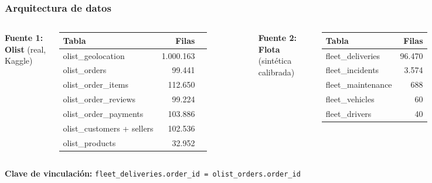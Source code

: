\documentclass[aspectratio=169,11pt]{beamer}
\begin{document}

\begin{frame}

\frametitle{Arquitectura de datos}

\begin{columns}[T]

\centering
\textbf{Fuente 1: Olist} {\small (real, Kaggle)}

\vspace{1mm}

\begin{tabular}{@{}lrr@{}}
\toprule
Tabla & Filas \\
\midrule
olist\_geolocation & 1.000.163 \\
olist\_orders & 99.441 \\
olist\_order\_items & 112.650 \\
olist\_order\_reviews & 99.224 \\
olist\_order\_payments & 103.886 \\
olist\_customers + sellers & 102.536 \\
olist\_products & 32.952 \\
\bottomrule
\end{tabular}



\centering
\textbf{Fuente 2: Flota} {\small (sintética calibrada)}

\vspace{1mm}

\begin{tabular}{@{}lr@{}}
\toprule
Tabla & Filas \\
\midrule
fleet\_deliveries & 96.470 \\
fleet\_incidents & 3.574 \\
fleet\_maintenance & 688 \\
fleet\_vehicles & 60 \\
fleet\_drivers & 40 \\
\bottomrule
\end{tabular}

\end{columns}

\centering

\vspace{3mm}

{\small
	\textbf{Clave de vinculación:}
	\texttt{fleet\_deliveries.order\_id = olist\_orders.order\_id}
}


\end{frame}
\end{document}
